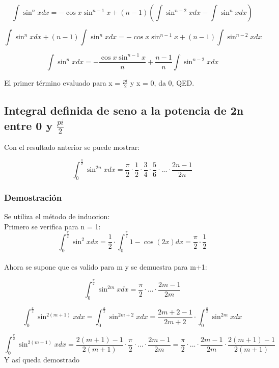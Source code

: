 \documentclass[12pt]{article}
\begin{document}
\begin{large}
\begin{equation}
 \int \sin^n x dx = -\cos x\sin^{n-1} x + (n-1)(\int \sin^{n-2} xdx - \int \sin^n xdx)
\end{equation}

\begin{equation}
 \int \sin^n x dx + (n-1)\int \sin^n xdx = -\cos x\sin^{n-1} x + (n-1)\int \sin^{n-2} xdx
\end{equation}

\begin{equation}
 \int \sin^n x dx = -\frac{\cos x\sin^{n-1} x}{n} + \frac{n-1}{n}\int \sin^{n-2} xdx
\end{equation}

El primer término evaluado para x = $\displaystyle \frac{pi}{2}$ y x = 0, da 0, QED.

\subsection{Integral definida de seno a la potencia de 2n entre 0 y $\displaystyle \frac{pi}{2}$}
Con el resultado anterior se puede mostrar:

\begin{equation}
 \int_0^\frac{\pi}{2} \sin^{2n} x dx = \frac{\pi}{2} \cdot \frac{1}{2} \cdot \frac{3}{4} \cdot \frac{5}{6} \cdot ... \cdot \frac{2n-1}{2n}
\end{equation}

\subsubsection{Demostración}
Se utiliza el método de induccion:\\
Primero se verifica para n = 1:\\

\begin{equation}
 \int_0^\frac{\pi}{2} \sin^{2} x dx = \frac{1}{2} \cdot \int_0^\frac{\pi}{2} 1-\cos (2x)dx = \frac{\pi}{2} \cdot \frac{1}{2}
\end{equation}
\\
Ahora se supone que es valido para m y se demuestra para m+1:

\begin{equation}
 \int_0^\frac{\pi}{2} \sin^{2m} x dx = \frac{\pi}{2} \cdot ... \cdot \frac{2m-1}{2m}
\end{equation}

\begin{equation}
 \int_0^\frac{\pi}{2} \sin^{2(m+1)} x dx = \int_0^\frac{\pi}{2} \sin^{2m+2} x dx = \frac{2m+2-1}{2m+2} \cdot \int_0^\frac{\pi}{2} \sin^{2m} x dx
\end{equation}

\begin{equation}
 \int_0^\frac{\pi}{2} \sin^{2(m+1)} x dx = \frac{2(m+1)-1}{2(m+1)} \cdot \frac{\pi}{2} \cdot ... \cdot \frac{2m-1}{2m} 
= \frac{\pi}{2} \cdot ... \cdot \frac{2m-1}{2m} \cdot \frac{2(m+1)-1}{2(m+1)}
\end{equation}
Y así queda demostrado

\end{large}
\end{document}
